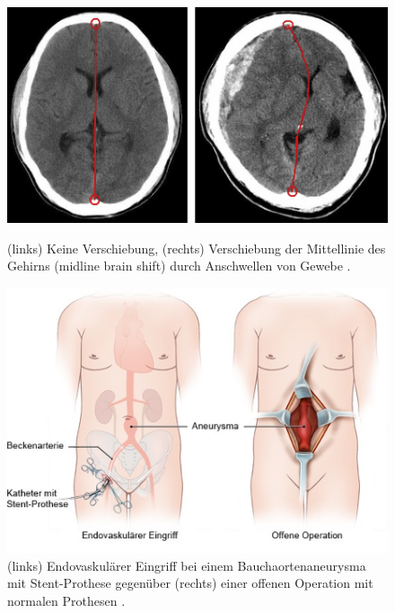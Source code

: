 \begin{figure}[!htb]
	\includegraphics[width=\linewidth]{Content/Pictures/brainshift.png}
	\caption{(links) Keine Verschiebung, (rechts) Verschiebung der Mittellinie des Gehirns (midline brain shift) durch Anschwellen von Gewebe \cite{BrainShiftImage}.}
	\label{fig:brainshift}
	\endminipage\hfill
	\includegraphics[width=\linewidth]{Content/Pictures/bauchaorten.png}
	\caption{(links) Endovaskulärer Eingriff bei einem Bauchaortenaneurysma mit Stent-Prothese gegenüber (rechts) einer offenen Operation mit normalen Prothesen \cite{BauaortenaneurysmaBild}.}
	\label{fig:bauchaorten}
	\endminipage
\end{figure}


